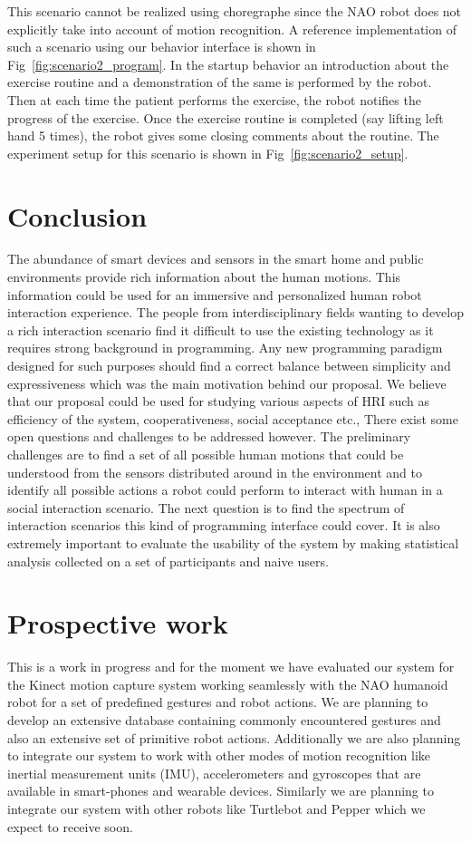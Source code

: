 \documentclass{llncs}
\begin{document}
	This scenario cannot be realized using choregraphe since the NAO robot does not explicitly take into account of motion recognition. A reference implementation of such a scenario using our behavior interface is shown in Fig~\ref{fig:scenario2_program}. In the startup behavior an introduction about the exercise routine and a demonstration of the same is performed by the robot. Then at each time the patient performs the exercise, the robot notifies the progress of the exercise. Once the exercise routine is completed (say lifting left hand 5 times), the robot gives some closing comments about the routine. The experiment setup for this scenario is shown in Fig~\ref{fig:scenario2_setup}.
\section{Conclusion}
\quad The abundance of smart devices and sensors in the smart home and public environments provide rich information about the human motions. This information could be used for an immersive and personalized human robot interaction experience. The people from interdisciplinary fields wanting to develop a rich interaction scenario find it difficult to use the existing technology as it requires strong background in programming. Any new programming paradigm designed for such purposes should find a correct balance between simplicity and expressiveness which was the main motivation behind our proposal. We believe that our proposal could be used for studying various aspects of HRI such as efficiency of the system, cooperativeness, social acceptance etc., There exist some open questions and challenges to be addressed however. The preliminary challenges are to find a set of all possible human motions that could be understood from the sensors distributed around in the environment and to identify all possible actions a robot could perform to interact with human in a social interaction scenario. The next question is to find the spectrum of interaction scenarios this kind of programming interface could cover. It is also extremely important to evaluate the usability of the system by making statistical analysis collected on a set of participants and naive users.
\section{Prospective work}
\quad This is a work in progress and for the moment we have evaluated our system for the Kinect motion capture system working seamlessly with the NAO humanoid robot for a set of predefined gestures and robot actions. We are planning to develop an extensive database containing commonly encountered gestures and also an extensive set of primitive robot actions. Additionally we are also planning to integrate our system to work with other modes of motion recognition like inertial measurement units (IMU), accelerometers and gyroscopes that are available in smart-phones and wearable devices. Similarly we are planning to integrate our system with other robots like Turtlebot and Pepper which we expect to receive soon.
\end{document}
